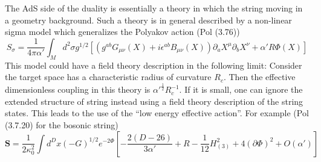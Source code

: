 The AdS side of the duality is essentially a theory
in which the string moving in a geometry background.
Such a theory is in general described by a non-linear sigma model
which generalizes the Polyakov action (Pol (3.76))
\begin{equation}
	S_\sigma = \frac{1}{4 \pi \alpha'}
	\int_M d^2\sigma g^{1 / 2}
	\left[ \left( g^{ab} G_{\mu\nu}(X) + i \epsilon^{ab} B_{\mu\nu}(X) \right)
	\partial_a X^\mu \partial_b X^\nu
	+ \alpha' R \Phi(X)\right] 
\end{equation}
This model could have a field theory description in the following limit:
Consider the target space has a characteristic radius of curvature
$R_c$.
Then the effective dimensionless coupling in this theory is $\alpha'^{\frac{1}{2}} R_c^{-1}$.
If it is small,
one can ignore the extended structure of string
instead using a field theory description of the string states.
This leads to the use of the ``low energy effective action''.
For example (Pol (3.7.20) for the bosonic string)
\begin{equation}
	\mathbf{S} = \frac{1}{2\kappa_0^2} \int d^D x (-G)^{1 / 2}	
	e^{-2\Phi} \left[ - \frac{2(D-26)}{3\alpha'} + R - \frac{1}{12} H_{(3)}^2 + 4 (\partial\Phi)^2 + O(\alpha')\right] 
\end{equation}

